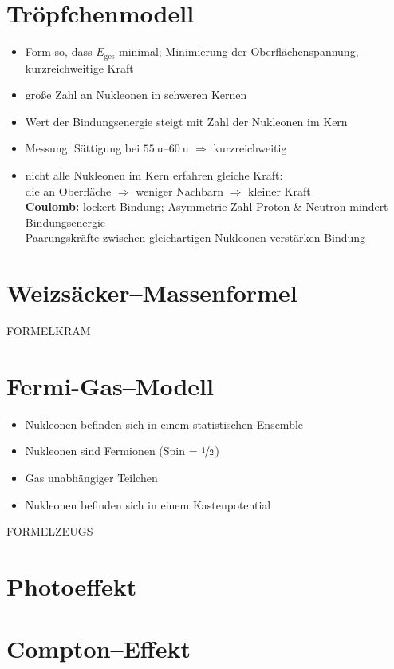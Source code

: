 \documentclass[BCOR=5mm,DIV=calc,listof=totoc,headings=big]{scrartcl}
\begin{document}
\section{Tröpfchenmodell}
\label{sec:tropfchenmodell}
\begin{itemize}
\item Form so, dass $E_{\text{ges}}$ minimal; Minimierung der
  Oberflächenspannung, kurzreichweitige Kraft
\item große Zahl an Nukleonen in schweren Kernen
\item Wert der Bindungsenergie steigt mit Zahl der Nukleonen im Kern
\item Messung: Sättigung bei $\SIrange{55}{60}{\amu}$ $\Rightarrow$ kurzreichweitig
\item nicht alle Nukleonen im Kern erfahren gleiche Kraft:\\
  die an Oberfläche $\Rightarrow$ weniger Nachbarn $\Rightarrow$
  kleiner Kraft\\
  \textbf{Coulomb:} lockert Bindung; Asymmetrie Zahl Proton \& Neutron
  mindert Bindungsenergie\\
  Paarungskräfte zwischen gleichartigen Nukleonen verstärken Bindung
\end{itemize}

\section{Weizsäcker--Massenformel}
\label{sec:weizs-mass}
FORMELKRAM

\section{Fermi-Gas--Modell}
\label{sec:fermi-gas-modell}
\begin{itemize}
\item Nukleonen befinden sich in einem statistischen Ensemble
\item Nukleonen sind Fermionen (Spin = $\nicefrac{1}{2}$)
\item Gas unabhängiger Teilchen
\item Nukleonen befinden sich in einem Kastenpotential
\end{itemize}
FORMELZEUGS

\section{Photoeffekt}
\label{sec:photoeffekt}

\section{Compton--Effekt}
\label{sec:compton-effekt}
\end{document}
